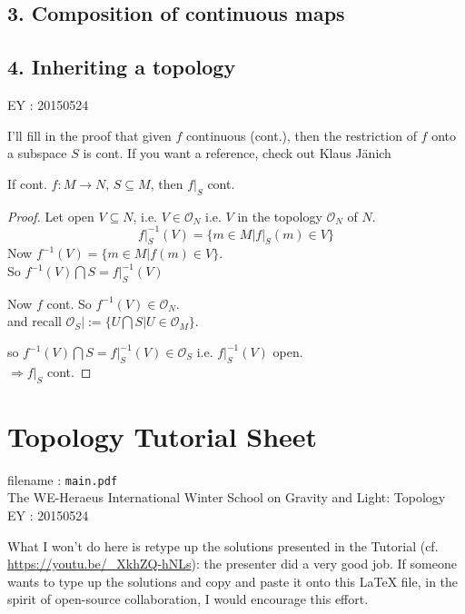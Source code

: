 \documentclass[10pt]{amsart}
\begin{document}
\begin{multicols*}{2}
\subsection{3. Composition of continuous maps}

\subsection{4. Inheriting a topology}


EY : 20150524

I'll fill in the proof that given $f$ continuous (cont.), then the restriction of $f$ onto a subspace $S$ is cont.  If you want a reference, check out Klaus J\"{a}nich \cite[pp. 13, Ch. 1 Fundamental Concepts, Sec. Continuous Maps]{KJanich1995}

If cont. $f: M \to N$, $S \subseteq M$, then $\left. f \right|_S$ cont.  

\begin{proof}
	Let open $V \subseteq N$, i.e. $V \in \mathcal{O}_N$ i.e. $V$ in the topology $\mathcal{O}_N$ of $N$.  
	\[
	\left. f\right|_S^{-1}(V) = \lbrace m \in M | \left. f \right|_S(m) \in V \rbrace
	\]
	Now $f^{-1}(V) = \lbrace m \in M | f(m) \in V \rbrace$. \\
	So $f^{-1}(V) \bigcap S = \left. f \right|_S^{-1}(V)$
	
	Now $f$ cont. So $f^{-1}(V) \in \mathcal{O}_N$.  \\
	and recall $\left. \mathcal{O}_S \right| := \lbrace U \bigcap S | U \in \mathcal{O}_M \rbrace$.  
	
	so $f^{-1}(V) \bigcap S = \left. f \right|_S^{-1}(V) \in \mathcal{O}_S$ i.e. $\left. f\right|_S^{-1}(V)$ open. \\
	$\Longrightarrow \left. f\right|_S$ cont.  
\end{proof}

\section*{Topology Tutorial Sheet}
filename : \texttt{main.pdf} \\
The WE-Heraeus International Winter School on Gravity and Light: Topology \\

EY : 20150524  

What I won't do here is retype up the solutions presented in the Tutorial (cf. \url{https://youtu.be/_XkhZQ-hNLs}): the presenter did a very good job.  If someone wants to type up the solutions and copy and paste it onto this LaTeX file, in the spirit of open-source collaboration, I would encourage this effort. 


\end{multicols*}
\end{document}
